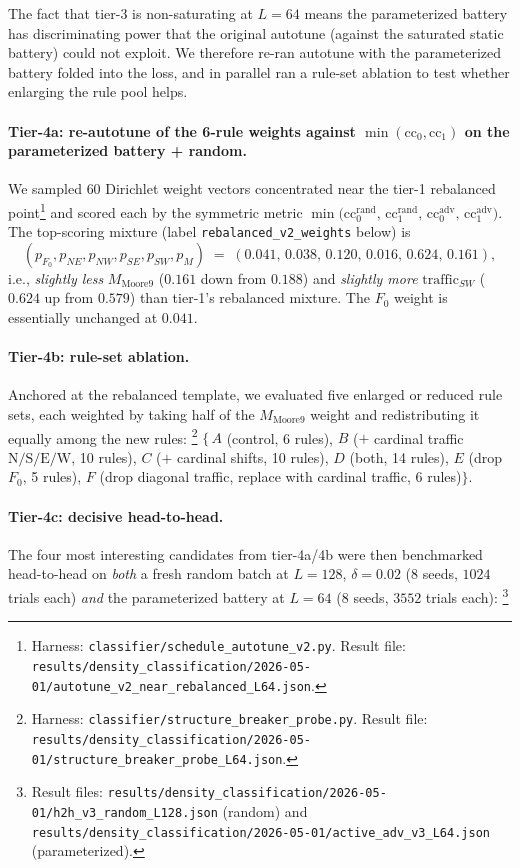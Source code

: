 \documentclass[11pt,a4paper]{article}
\newcommand{\fpath}[1]{\nolinkurl{#1}}
\begin{document}
The fact that tier-3 is non-saturating at \(L=64\) means the
parameterized battery has discriminating power that the original
autotune (against the saturated static battery) could not exploit.
We therefore re-ran autotune with the parameterized battery folded
into the loss, and in parallel ran a rule-set ablation to test
whether enlarging the rule pool helps.

\paragraph{Tier-4a: re-autotune of the 6-rule weights against
\(\min(\mathrm{cc}_0, \mathrm{cc}_1)\) on the parameterized battery
+ random.}
We sampled \(60\) Dirichlet weight vectors concentrated near the
tier-1 rebalanced point\footnote{Harness:
\fpath{classifier/schedule_autotune_v2.py}.  Result file:
\fpath{results/density_classification/2026-05-01/autotune_v2_near_rebalanced_L64.json}.}
and scored each by the symmetric metric
\(\min\bigl(\mathrm{cc}_0^{\mathrm{rand}},\,\mathrm{cc}_1^{\mathrm{rand}},\,
   \mathrm{cc}_0^{\mathrm{adv}},\,\mathrm{cc}_1^{\mathrm{adv}}\bigr)\).
The top-scoring mixture (label \texttt{rebalanced\_v2\_weights} below)
is
\[
(p_{F_0}, p_{NE}, p_{NW}, p_{SE}, p_{SW}, p_M)
\;=\;
(0.041,\, 0.038,\, 0.120,\, 0.016,\, 0.624,\, 0.161),
\]
i.e., \emph{slightly less} \(M_{\mathrm{Moore9}}\) (\(0.161\) down from
\(0.188\)) and \emph{slightly more} \(\mathrm{traffic}_{SW}\)
(\(0.624\) up from \(0.579\)) than tier-1's rebalanced mixture.  The
\(F_0\) weight is essentially unchanged at \(0.041\).

\paragraph{Tier-4b: rule-set ablation.}
Anchored at the rebalanced template, we evaluated five enlarged or
reduced rule sets, each weighted by taking half of the
\(M_{\mathrm{Moore9}}\) weight and redistributing it equally among
the new rules:%
\footnote{Harness:
\fpath{classifier/structure_breaker_probe.py}.  Result file:
\fpath{results/density_classification/2026-05-01/structure_breaker_probe_L64.json}.}
\(\{\,A\) (control, 6 rules), \(B\) (\(+\) cardinal traffic
\(\mathrm{N/S/E/W}\), 10 rules), \(C\) (\(+\) cardinal shifts, 10
rules), \(D\) (both, 14 rules), \(E\) (drop \(F_0\), 5 rules),
\(F\) (drop diagonal traffic, replace with cardinal traffic, 6
rules)\(\}\).

\paragraph{Tier-4c: decisive head-to-head.}
The four most interesting candidates from tier-4a/4b were then
benchmarked head-to-head on \emph{both} a fresh random batch at
\(L=128\), \(\delta=0.02\) (8 seeds, \(1024\) trials each) \emph{and}
the parameterized battery at \(L=64\) (8 seeds, \(3552\) trials
each):%
\footnote{Result files:
\fpath{results/density_classification/2026-05-01/h2h_v3_random_L128.json}
(random) and
\fpath{results/density_classification/2026-05-01/active_adv_v3_L64.json}
(parameterized).}
\end{document}
